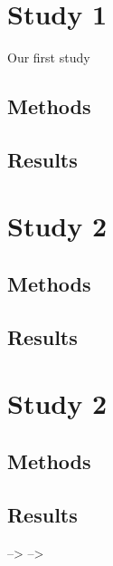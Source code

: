 \section{Study 1}

Our first study

\subsection{Methods}

\subsection{Results}

\section{Study 2}

\subsection{Methods}

\subsection{Results}

\section{Study 2}

\subsection{Methods}

\subsection{Results}

--\textgreater{} --\textgreater{}
